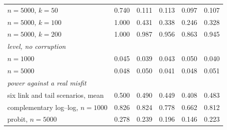 \begin{table}[htbp]
\begin{tabular}{lrrrrr}
\quad $n=5000$, $k=50$ & 0.740 & 0.111 & 0.113 & 0.097 & 0.107 \\
\quad $n=5000$, $k=100$ & 1.000 & 0.431 & 0.338 & 0.246 & 0.328 \\
\quad $n=5000$, $k=200$ & 1.000 & 0.987 & 0.956 & 0.863 & 0.945 \\
\multicolumn{6}{l}{\emph{level, no corruption}} \\
\quad $n=1000$ & 0.045 & 0.039 & 0.043 & 0.050 & 0.040 \\
\quad $n=5000$ & 0.048 & 0.050 & 0.041 & 0.048 & 0.051 \\
\multicolumn{6}{l}{\emph{power against a real misfit}} \\
\quad six link and tail scenarios, mean & 0.500 & 0.490 & 0.449 & 0.408 & 0.483 \\
\quad complementary log--log, $n=1000$ & 0.826 & 0.824 & 0.778 & 0.662 & 0.812 \\
\quad probit, $n=5000$ & 0.278 & 0.239 & 0.196 & 0.146 & 0.223 \\
\hline\end{tabular}\end{table}
